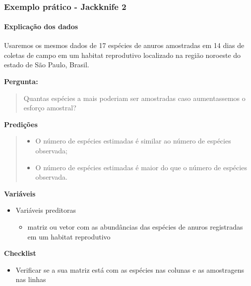 \documentclass[
]{book}
\providecommand{\tightlist}{%
  \setlength{\itemsep}{0pt}\setlength{\parskip}{0pt}}
\begin{document}
~

\hypertarget{exemplo-pruxe1tico---jackknife-2}{%
\subsubsection{Exemplo prático - Jackknife 2}\label{exemplo-pruxe1tico---jackknife-2}}

\hypertarget{explicauxe7uxe3o-dos-dados-4}{%
\paragraph{Explicação dos dados}\label{explicauxe7uxe3o-dos-dados-4}}

Usaremos os mesmos dados de 17 espécies de anuros amostradas em 14 dias de coletas de campo em um habitat reprodutivo localizado na região noroeste do estado de São Paulo, Brasil.

\textbf{Pergunta:}

\begin{quote}
Quantas espécies a mais poderiam ser amostradas caso aumentassemos o esforço amostral?
\end{quote}

\textbf{Predições}

\begin{quote}
\begin{itemize}
\tightlist
\item
  O número de espécies estimadas é similar ao número de espécies observada;
\item
  O número de espécies estimadas é maior do que o número de espécies observada.
\end{itemize}
\end{quote}

\textbf{Variáveis}

\begin{itemize}
\tightlist
\item
  Variáveis preditoras

  \begin{itemize}
  \tightlist
  \item
    matriz ou vetor com as abundâncias das espécies de anuros registradas em um habitat reprodutivo
  \end{itemize}
\end{itemize}

\textbf{Checklist}

\begin{itemize}
\tightlist
\item
  Verificar se a sua matriz está com as espécies nas colunas e as amostragens nas linhas
\end{itemize}
\end{document}
